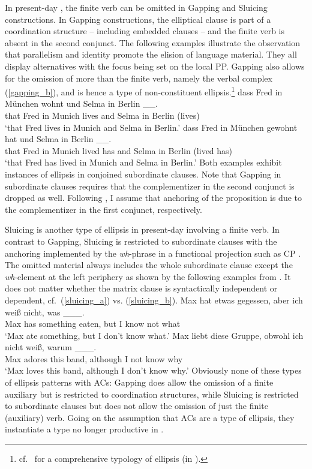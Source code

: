\documentclass[output=paper,colorlinks,citecolor=brown]{langscibook}
\begin{document}
In present-day , the finite verb can be omitted in Gapping and Sluicing constructions. In Gapping constructions, the elliptical clause is part of a coordination structure -- including embedded clauses -- and the finite verb is absent in the second conjunct. The following examples illustrate the observation that parallelism and identity promote the elision of language material. They all display alternatives with the focus being set on the local PP. Gapping also allows for the omission of more than the finite verb, namely the verbal complex (\ref{gapping_b}), and is hence a type of non-constituent ellipsis.\footnote{cf.\ \citet{reich2011} for a comprehensive typology of ellipsis (in ).} 
\eal \label{gapping_a}
\ex  
\gll dass Fred in München wohnt und Selma in Berlin \_\_. \\ that Fred in Munich lives and Selma in Berlin (lives)  \\ 
\glt `that Fred lives in Munich and Selma in Berlin.'
\ex \label{gapping_b} 
\gll dass Fred in München gewohnt hat und Selma in Berlin \_\_. \\ that Fred in Munich lived has and Selma in Berlin (lived has)  \\
\glt `that Fred has lived in Munich and Selma in Berlin.'
\zl
Both examples exhibit instances of ellipsis in conjoined subordinate clauses. Note that Gapping in subordinate clauses requires that the complementizer in the second conjunct is dropped as well. Following \citet{repp2009}, I assume that anchoring of the proposition is due to the complementizer in the first conjunct, respectively. 

Sluicing is another type of ellipsis in present-day  involving a finite verb. In contrast to Gapping, Sluicing is restricted to subordinate clauses with the anchoring implemented by the \textit{wh}-phrase in a functional projection such as CP \citep{repp2009}. The omitted material always includes the whole subordinate clause except the \textit{wh}-element at the left periphery as shown by the following examples from \textcite{repp2009}. It does not matter whether the matrix clause is syntactically independent or dependent, cf.\ (\ref{sluicing_a}) vs. (\ref{sluicing_b}).
\eal
\ex \label{sluicing_a}
\gll Max hat etwas gegessen, aber ich weiß nicht, was \_\_\_. \\ Max has something eaten, but I know not what  \\
\glt `Max ate something, but I don't know what.'
\ex \label{sluicing_b}
\gll Max liebt diese Gruppe, obwohl ich nicht weiß, warum \_\_\_.\\ Max adores this band, although I not know why  \\
\glt `Max loves this band, although I don't know why.'
\zl
Obviously none of these types of ellipsis patterns with ACs: Gapping does allow the omission of a finite auxiliary but is restricted to coordination structures, while Sluicing is restricted to subordinate clauses but does not allow the omission of just the finite (auxiliary) verb. Going on the assumption that ACs are a type of ellipsis, they instantiate a type no longer productive in .
\end{document}
